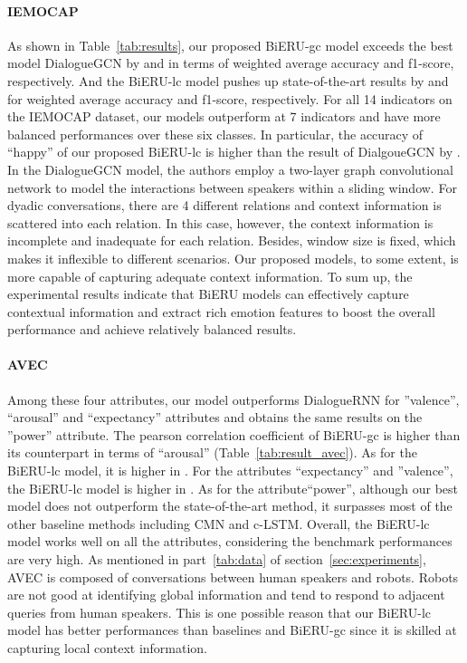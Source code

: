 \documentclass[journal]{IEEEtran}
\begin{document}
\paragraph{IEMOCAP}
As shown in Table~\ref{tab:results}, our proposed BiERU-gc model exceeds the best model DialogueGCN by  and  in terms of weighted average accuracy and f1-score, respectively. And the BiERU-lc model pushes up state-of-the-art results by  and  for weighted average accuracy and f1-score, respectively. For all 14 indicators on the IEMOCAP dataset, our models outperform at 7 indicators and have more balanced performances over these six classes. In particular, the accuracy of ``happy'' of our proposed BiERU-lc is higher than the result of DialgoueGCN by . In the DialogueGCN model, the authors employ a two-layer graph convolutional network to model the interactions between speakers within a sliding window. For dyadic conversations, there are 4 different relations and context information is scattered into each relation. In this case, however, the context information is incomplete and inadequate for each relation. Besides, window size is fixed, which makes it inflexible to different scenarios. Our proposed models, to some extent, is more capable of capturing adequate context information. To sum up, the experimental results indicate that BiERU models can effectively capture contextual information and extract rich emotion features to boost the overall performance and achieve relatively balanced results. 



\paragraph{AVEC}
Among these four attributes, our model outperforms DialogueRNN for ''valence'', ``arousal'' and ``expectancy'' attributes and obtains the same results on the ''power'' attribute. The pearson correlation coefficient  of BiERU-gc is  higher than its counterpart in terms of ``arousal'' (Table~\ref{tab:result_avec}). As for the BiERU-lc model, it is  higher in . For the attributes ``expectancy'' and ''valence'', the BiERU-lc model is  higher in . As for the attribute``power'', although our best model does not outperform the state-of-the-art method, it surpasses most of the other baseline methods including CMN and c-LSTM.
Overall, the BiERU-lc model works well on all the attributes, considering the benchmark performances are very high.  As mentioned in part~\ref{tab:data} of section~\ref{sec:experiments}, AVEC is composed of conversations between human speakers and robots. Robots are not good at identifying global information and tend to respond to adjacent queries from human speakers. This is one possible reason that our BiERU-lc model has better performances than baselines and BiERU-gc since it is skilled at capturing local context information.
\end{document}
